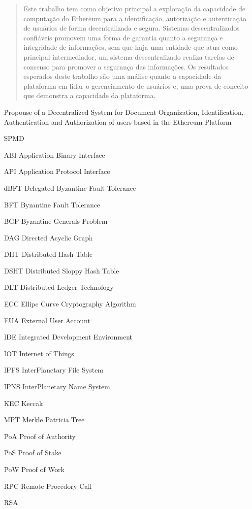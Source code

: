 \documentclass[tcc,capa]{texufpel}
\begin{document}
\begin{abstract}
    Este trabalho tem como objetivo principal a exploração da capacidade de computação do Ethereum para a identificação, autorização e autenticação de usuários de forma decentralizada e segura. Sistemas descentralizados confiáveis promovem uma forma de garantia quanto a segurança e integridade de informações, sem que haja uma entidade que atua como principal intermediador, um sistema descentralizado realiza tarefas de consenso para promover a segurança das informações.  Os resultados esperados deste trabalho são uma análise quanto a capacidade da plataforma em lidar o gerenciamento de usuários e, uma prova de conceito que demonstra a capacidade da plataforma.
\end{abstract}

\begin{englishabstract}%
  {Propouse of a Decentralized System for Document Organization, Identification, Authentication and Authorization of users based in the Ethereum Platform}
  
\end{englishabstract}

\listoffigures

\listoftables

\lstlistoflistings

\begin{listofabbrv}{SPMD}
    \item[ABI] Application Binary Interface
    \item[API] Application Protocol Interface
    \item[dBFT] Delegated Byzantine Fault Tolerance
    \item[BFT] Byzantine Fault Tolerance
    \item[BGP] Byzantine Generals Problem
    \item[DAG] Directed Acyclic Graph
    \item[DHT] Distributed Hash Table
    \item[DSHT] Distributed Sloppy Hash Table 
    \item[DLT] Distributed Ledger Technology
    \item[ECC] Ellipc Curve Cryptography Algorithm
    \item[EUA] External User Account 
    \item[IDE] Integrated Development Environment
    \item[IOT] Internet of Things
    \item[IPFS] InterPlanetary File System
    \item[IPNS] InterPlanetary Name System
    \item[KEC] Keccak
    \item[MPT] Merkle Patricia Tree
    \item[PoA] Proof of Authority
    \item[PoS] Proof of Stake
    \item[PoW] Proof of Work
    \item[RPC] Remote Procedory Call
    \item[RSA] 
\end{listofabbrv}
\end{document}
